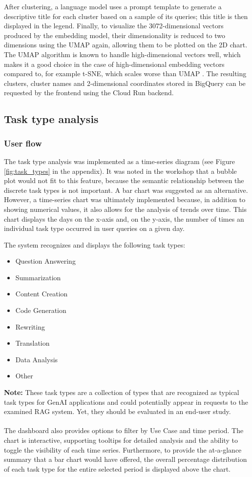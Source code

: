 \documentclass[
	english,
	ruledheaders=section,%
	class=report,%
	thesis={type=bachelor},%
	accentcolor=1b,%
	custommargins=true,%
	marginpar=false,%
	parskip=half-,%
	fontsize=11pt,%
	DIV=14,
]{tudapub}
\begin{document}
After clustering, a language model uses a prompt template to generate a descriptive title for each cluster based on a sample of its queries; this title is then displayed in the legend. Finally, to visualize the 3072-dimensional vectors produced by the embedding model, their dimensionality is reduced to two dimensions using the UMAP again, allowing them to be plotted on the 2D chart. The UMAP algorithm is known to handle high-dimensional vectors well, which makes it a good choice in the case of high-dimensional embedding vectors compared to, for example t-SNE, which scales worse than UMAP \parencite[pp.~51]{McInnes2020}.
The resulting clusters, cluster names and 2-dimensional coordinates stored in BigQuery can be requested by the frontend using the Cloud Run backend.
\subsection{Task type analysis}
\subsubsection{User flow}
The task type analysis was implemented as a time-series diagram (see Figure \ref{fig:task_types} in the appendix). It was noted in the workshop that a bubble plot would not fit to this feature, because the semantic relationship between the discrete task types is not important. A bar chart was suggested as an alternative. However, a time-series chart was ultimately implemented because, in addition to showing numerical values, it also allows for the analysis of trends over time. This chart displays the days on the x-axis and, on the y-axis, the number of times an individual task type occurred in user queries on a given day.

The system recognizes and displays the following task types:
\begin{itemize}
    \item Question Answering
    \item Summarization
    \item Content Creation
    \item Code Generation
    \item Rewriting
    \item Translation
    \item Data Analysis
    \item Other
\end{itemize}
\textbf{Note:} These task types are a collection of types that are recognized as typical task types for GenAI applications and could potentially appear in requests to the examined RAG system. Yet, they should be evaluated in an end-user study.\\
\\
The dashboard also provides options to filter by Use Case and time period. The chart is interactive, supporting tooltips for detailed analysis and the ability to toggle the visibility of each time series. Furthermore, to provide the at-a-glance summary that a bar chart would have offered, the overall percentage distribution of each task type for the entire selected period is displayed above the chart.
\end{document}

